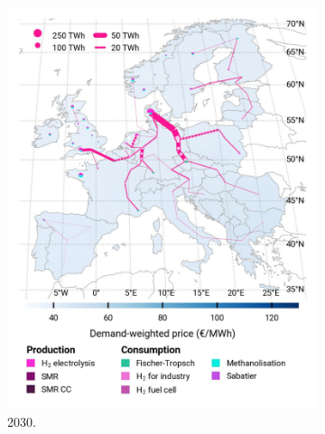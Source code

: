 \documentclass[preprint,12pt,sort&compress]{elsarticle}
\begin{document}
\begin{figure}[htbp]
  \centering
  \begin{subfigure}[t]{0.33\textwidth}
      \vspace{0pt}
      \includegraphics[width=1\textwidth]{maps/pcipmi-national-international-expansion/base_s_adm___2030-balance_map_H2}
      \caption{ 2030.}
      \label{fig:PCI-in_lt_2030_h2}
  \end{subfigure}
  \begin{subfigure}[t]{0.33\textwidth}
      \vspace{0pt}

\end{subfigure}
\end{figure}
\end{document}

